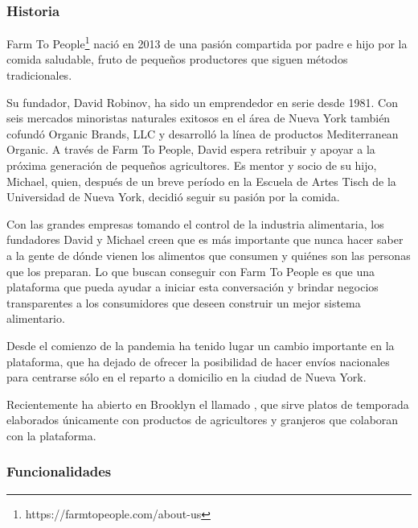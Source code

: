
\subsubsection{Historia}

Farm To People\footnote{https://farmtopeople.com/about-us} nació en 2013 de una pasión compartida por padre e hijo por la comida saludable, fruto de pequeños productores que siguen métodos tradicionales.

Su fundador, David Robinov, ha sido un emprendedor en serie desde 1981. Con seis mercados minoristas naturales exitosos en el área de Nueva York también cofundó Organic Brands, LLC y desarrolló la línea de productos Mediterranean Organic. A través de Farm To People, David espera retribuir y apoyar a la próxima generación de pequeños agricultores. Es mentor y socio de su hijo, Michael, quien, después de un breve período en la Escuela de Artes Tisch de la Universidad de Nueva York, decidió seguir su pasión por la comida.

Con las grandes empresas tomando el control de la industria alimentaria, los fundadores David y Michael creen que es más importante que nunca hacer saber a la gente de dónde vienen los alimentos que consumen y quiénes son las personas que los preparan. Lo que buscan conseguir con Farm To People es que una plataforma que pueda ayudar a iniciar esta conversación y brindar negocios transparentes a los consumidores que deseen construir un mejor sistema alimentario.

Desde el comienzo de la pandemia ha tenido lugar un cambio importante en la plataforma, que ha dejado de ofrecer la posibilidad de hacer envíos nacionales para centrarse sólo en el reparto a domicilio en la ciudad de Nueva York.

Recientemente ha abierto en Brooklyn el llamado , que sirve platos de temporada elaborados únicamente con productos de agricultores y granjeros que colaboran con la plataforma.

\subsubsection{Funcionalidades}

